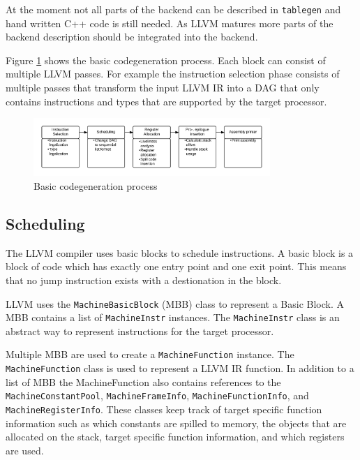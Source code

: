 At the moment not all parts of the backend can be described in \texttt{tablegen} and hand written C++ code is still needed. As LLVM matures more parts of the backend description should be integrated into the backend. 

Figure \ref{fig:codegen_process} shows the basic codegeneration process. Each block can consist of multiple LLVM passes. For example the instruction selection phase consists of multiple passes that transform the input LLVM IR into a DAG that only contains instructions and types that are supported by the target processor.
\begin{figure}[ht]
\centering
\includegraphics[width=0.8\textwidth]{2_background/img/Codegen.png}
\caption{Basic codegeneration process}
\label{fig:codegen_process}
\end{figure}

\subsection{Scheduling} %
\label{sub:scheduling}
The LLVM compiler uses basic blocks to schedule instructions. A basic block is a block of code which has exactly one entry point and one exit point. This means that no jump instruction exists with a destionation in the block. 

LLVM uses the \texttt{MachineBasicBlock} (MBB) class to represent a Basic Block. A MBB contains a list of \texttt{MachineInstr} instances. The \texttt{MachineInstr} class is an abstract way to represent instructions for the target processor.

Multiple MBB are used to create a \texttt{MachineFunction} instance. The \texttt{MachineFunction} class is used to represent a LLVM IR function. In addition to a list of MBB the MachineFunction also contains references to the \texttt{MachineConstantPool}, \texttt{MachineFrameInfo}, \texttt{MachineFunctionInfo}, and \texttt{MachineRegisterInfo}. These classes keep track of target specific function information such as which constants are spilled to memory, the objects that are allocated on the stack, target specific function information, and which registers are used. 



